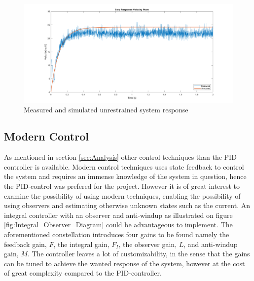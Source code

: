 \documentclass[../../main.tex]{subfiles}
\begin{document}
\begin{figure}
    \centering
    \includegraphics[width = 0.9 \textwidth]{Sections/Miscellaneous/Images/velocityPlantMes_vs_Sim.png}
    \caption{Measured and simulated unrestrained system response}
    \label{fig:Mes_vs_siml}
\end{figure}



\subsection*{Modern Control}
As mentioned in section \ref{sec:Analysis} other control techniques than the PID-controller is available. Modern control techniques uses state feedback to control the system and requires an immense knowledge of the system in question, hence the PID-control was prefered for the project. However it is of great interest to examine the possibility of using modern techniques, enabling the possibility of using observers and estimating otherwise unknown states such as the current. An integral controller with an observer and anti-windup as illustrated on figure \ref{fig:Integral_Observer_Diagram} could be advantageous to implement. The aforementioned constellation introduces four gains to be found namely the feedback gain, $F$, the integral gain, $F_I$, the observer gain, $L$, and anti-windup gain, $M$. The controller leaves a lot of customizability, in the sense that the gains can be tuned to achieve the wanted response of the system, however at the cost of great complexity compared to the PID-controller.
\end{document}
